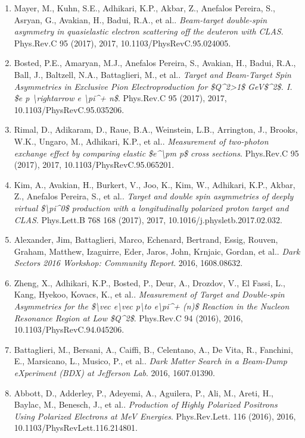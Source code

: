 \begin{enumerate}
\item Mayer, M., Kuhn, S.E., Adhikari, K.P., Akbar, Z., Anefalos Pereira, S., Asryan, G., Avakian, H., Badui, R.A., et al.. \textit{Beam-target double-spin asymmetry in quasielastic electron scattering off the deuteron with CLAS}. Phys.Rev.C 95 (2017), 2017, 10.1103/PhysRevC.95.024005.
\item Bosted, P.E., Amaryan, M.J., Anefalos Pereira, S., Avakian, H., Badui, R.A., Ball, J., Baltzell, N.A., Battaglieri, M., et al.. \textit{Target and Beam-Target Spin Asymmetries in Exclusive Pion Electroproduction for \$Q\textasciicircum{}2>1\$ GeV\$\textasciicircum{}2\$. I. \$e p \textbackslash{}rightarrow e \textbackslash{}pi\textasciicircum{}+ n\$}. Phys.Rev.C 95 (2017), 2017, 10.1103/PhysRevC.95.035206.
\item Rimal, D., Adikaram, D., Raue, B.A., Weinstein, L.B., Arrington, J., Brooks, W.K., Ungaro, M., Adhikari, K.P., et al.. \textit{Measurement of two-photon exchange effect by comparing elastic \$e\textasciicircum{}\textbackslash{}pm p\$ cross sections}. Phys.Rev.C 95 (2017), 2017, 10.1103/PhysRevC.95.065201.
\item Kim, A., Avakian, H., Burkert, V., Joo, K., Kim, W., Adhikari, K.P., Akbar, Z., Anefalos Pereira, S., et al.. \textit{Target and double spin asymmetries of deeply virtual \$\textbackslash{}pi\textasciicircum{}0\$ production with a longitudinally polarized proton target and CLAS}. Phys.Lett.B 768 168 (2017), 2017, 10.1016/j.physletb.2017.02.032.
\item Alexander, Jim, Battaglieri, Marco, Echenard, Bertrand, Essig, Rouven, Graham, Matthew, Izaguirre, Eder, Jaros, John, Krnjaic, Gordan, et al.. \textit{Dark Sectors 2016 Workshop: Community Report}. 2016, 1608.08632.
\item Zheng, X., Adhikari, K.P., Bosted, P., Deur, A., Drozdov, V., El Fassi, L., Kang, Hyekoo, Kovacs, K., et al.. \textit{Measurement of Target and Double-spin Asymmetries for the \$\textbackslash{}vec e\textbackslash{}vec p\textbackslash{}to e\textbackslash{}pi\textasciicircum{}+ (n)\$ Reaction in the Nucleon Resonance Region at Low \$Q\textasciicircum{}2\$}. Phys.Rev.C 94 (2016), 2016, 10.1103/PhysRevC.94.045206.
\item Battaglieri, M., Bersani, A., Caiffi, B., Celentano, A., De Vita, R., Fanchini, E., Marsicano, L., Musico, P., et al.. \textit{Dark Matter Search in a Beam-Dump eXperiment (BDX) at Jefferson Lab}. 2016, 1607.01390.
\item Abbott, D., Adderley, P., Adeyemi, A., Aguilera, P., Ali, M., Areti, H., Baylac, M., Benesch, J., et al.. \textit{Production of Highly Polarized Positrons Using Polarized Electrons at MeV Energies}. Phys.Rev.Lett. 116 (2016), 2016, 10.1103/PhysRevLett.116.214801.

\end{enumerate}
